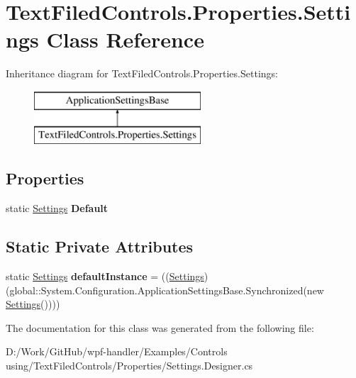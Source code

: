 \hypertarget{class_text_filed_controls_1_1_properties_1_1_settings}{}\section{Text\+Filed\+Controls.\+Properties.\+Settings Class Reference}
\label{class_text_filed_controls_1_1_properties_1_1_settings}
Inheritance diagram for Text\+Filed\+Controls.\+Properties.\+Settings\+:\begin{figure}[H]
\begin{center}
\leavevmode
\includegraphics[height=2.000000cm]{dd/d41/class_text_filed_controls_1_1_properties_1_1_settings}
\end{center}
\end{figure}
\subsection*{Properties}
\begin{DoxyCompactItemize}
\item 
\mbox{\label{class_text_filed_controls_1_1_properties_1_1_settings_ab7443accf4882567db426f02242cdf9d}} 
static \mbox{\hyperlink{class_text_filed_controls_1_1_properties_1_1_settings}{Settings}} {\bfseries Default}
\end{DoxyCompactItemize}
\subsection*{Static Private Attributes}
\begin{DoxyCompactItemize}
\item 
\mbox{\label{class_text_filed_controls_1_1_properties_1_1_settings_afaf5b1214e4659afa656b15c90765afb}} 
static \mbox{\hyperlink{class_text_filed_controls_1_1_properties_1_1_settings}{Settings}} {\bfseries default\+Instance} = ((\mbox{\hyperlink{class_text_filed_controls_1_1_properties_1_1_settings}{Settings}})(global\+::\+System.\+Configuration.\+Application\+Settings\+Base.\+Synchronized(new \mbox{\hyperlink{class_text_filed_controls_1_1_properties_1_1_settings}{Settings}}())))
\end{DoxyCompactItemize}


The documentation for this class was generated from the following file\+:\begin{DoxyCompactItemize}
\item 
D\+:/\+Work/\+Git\+Hub/wpf-\/handler/\+Examples/\+Controls using/\+Text\+Filed\+Controls/\+Properties/Settings.\+Designer.\+cs\end{DoxyCompactItemize}
